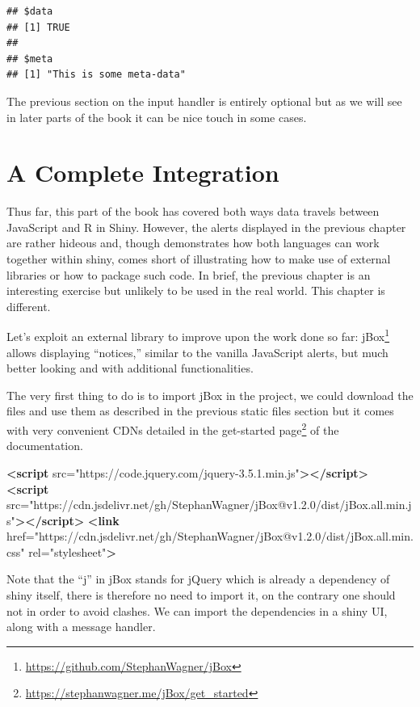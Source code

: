 \documentclass[
]{krantz}
\makeatletter
\newenvironment{Shaded}{\begin{snugshade}}{\end{snugshade}}
\newcommand{\KeywordTok}[1]{\textcolor[rgb]{0.27,0.27,0.27}{\textbf{#1}}}
\newcommand{\OtherTok}[1]{\textcolor[rgb]{0.37,0.37,0.37}{#1}}
\newcommand{\StringTok}[1]{\textcolor[rgb]{0.5,0.5,0.5}{#1}}
\renewcommand{\href}[2]{#2\footnote{\url{#1}}}
\newenvironment{kframe}{%
\medskip{}
\setlength{\fboxsep}{.8em}
 \def\at@end@of@kframe{}%
 \ifinner\ifhmode%
  \def\at@end@of@kframe{\end{minipage}}%
  \begin{minipage}{\columnwidth}%
 \fi\fi%
 \def\FrameCommand##1{\hskip\@totalleftmargin \hskip-\fboxsep
 \colorbox{shadecolor}{##1}\hskip-\fboxsep
     \hskip-\linewidth \hskip-\@totalleftmargin \hskip\columnwidth}%
 \MakeFramed {\advance\hsize-\width
   \@totalleftmargin\z@ \linewidth\hsize
   \@setminipage}}%
 {\par\unskip\endMakeFramed%
 \at@end@of@kframe}
\renewenvironment{Shaded}{\begin{kframe}}{\end{kframe}}
\makeatother
\begin{document}
\begin{verbatim}
## $data
## [1] TRUE
## 
## $meta
## [1] "This is some meta-data"
\end{verbatim}

The previous section on the input handler is entirely optional but as we will see in later parts of the book it can be nice touch in some cases.

\hypertarget{shiny-complete}{%
\chapter{A Complete Integration}\label{shiny-complete}}

Thus far, this part of the book has covered both ways data travels between JavaScript and R in Shiny. However, the alerts displayed in the previous chapter are rather hideous and, though demonstrates how both languages can work together within shiny, comes short of illustrating how to make use of external libraries or how to package such code. In brief, the previous chapter is an interesting exercise but unlikely to be used in the real world. This chapter is different.

Let's exploit an external library to improve upon the work done so far: \href{https://github.com/StephanWagner/jBox}{jBox} allows displaying ``notices,'' similar to the vanilla JavaScript alerts, but much better looking and with additional functionalities.

The very first thing to do is to import jBox in the project, we could download the files and use them as described in the previous static files section but it comes with very convenient CDNs detailed in the \href{https://stephanwagner.me/jBox/get_started}{get-started page} of the documentation.

\begin{Shaded}
\begin{Highlighting}[]
\KeywordTok{<script}\OtherTok{ src=}\StringTok{"https://code.jquery.com/jquery{-}3.5.1.min.js"}\KeywordTok{></script>}
\KeywordTok{<script}\OtherTok{ src=}\StringTok{"https://cdn.jsdelivr.net/gh/StephanWagner/jBox@v1.2.0/dist/jBox.all.min.js"}\KeywordTok{></script>}
\KeywordTok{<link}\OtherTok{ href=}\StringTok{"https://cdn.jsdelivr.net/gh/StephanWagner/jBox@v1.2.0/dist/jBox.all.min.css"}\OtherTok{ rel=}\StringTok{"stylesheet"}\KeywordTok{>}
\end{Highlighting}
\end{Shaded}

Note that the ``j'' in jBox stands for jQuery which is already a dependency of shiny itself, there is therefore no need to import it, on the contrary one should not in order to avoid clashes. We can import the dependencies in a shiny UI, along with a message handler.
\end{document}
